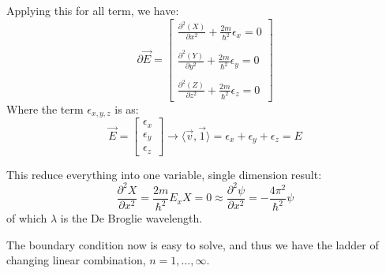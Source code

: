 Applying this for all term, we have: 
\begin{equation}
  \partial \vec{E}= \begin{bmatrix}
    \displaystyle{\frac{\partial^{2}(X)}{\partial x^{2}}+ \frac{2m}{\hbar^{2}}\epsilon_{x} = 0} \\\\
    \displaystyle{\frac{\partial^{2}(Y)}{\partial y^{2}}+ \frac{2m}{\hbar^{2}}\epsilon_{y} = 0} \\\\
    \displaystyle{\frac{\partial^{2}(Z)}{\partial z^{2}}+ \frac{2m}{\hbar^{2}}\epsilon_{z} = 0} 
    \end{bmatrix}
\end{equation}
Where the term $\epsilon_{x,y,z}$ is as: 
\begin{equation}
  \vec{E} = \begin{bmatrix}
    \epsilon_x\\
    \epsilon_y\\
    \epsilon_z
  \end{bmatrix} \longrightarrow \langle \vec{v}, \vec{1}\rangle = \epsilon_x + \epsilon_y + \epsilon_z = E
\end{equation}

This reduce everything into one variable, single dimension result: 
\begin{equation*}
  \frac{\partial^{2}X}{\partial x^{2}}=\frac{2m}{\hbar^{2}}E_{x}X=0 \approx \frac{\partial^{2}\psi}{\partial x^{2}}=-\frac{4\pi^{2}}{\hbar^{2}}\psi
\end{equation*}
of which $\lambda$ is the De Broglie wavelength. 

The boundary condition now is easy to solve, and thus we have the ladder of changing linear combination, $n=1,\dots,\infty$.

